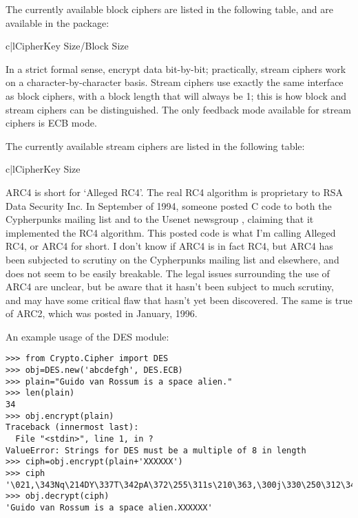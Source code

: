 \documentclass{howto}
\begin{document}
The currently available block ciphers are listed in the following table,
and are available in the  package:


\begin{tableii}{c|l}{}{Cipher}{Key Size/Block Size}
\end{tableii}

In a strict formal sense,  encrypt data bit-by-bit;
practically, stream ciphers work on a character-by-character basis.
Stream ciphers use exactly the
same interface as block ciphers, with a block length that will always
be 1; this is how block and stream ciphers can be distinguished. 
The only feedback mode available for stream ciphers is ECB mode. 

The currently available stream ciphers are listed in the following table:

\begin{tableii}{c|l}{}{Cipher}{Key Size}
\end{tableii}

ARC4 is short for `Alleged RC4'.  The real RC4 algorithm is proprietary
to RSA Data Security Inc.  In September of 1994, someone posted C code
to both the Cypherpunks mailing list and to the Usenet newsgroup
, claiming that it implemented the RC4 algorithm.  This
posted code is what I'm calling Alleged RC4, or ARC4 for short.  I don't
know if ARC4 is in fact RC4, but ARC4 has been subjected to scrutiny on
the Cypherpunks mailing list and elsewhere, and does not seem to be
easily breakable.  The legal issues surrounding the use of ARC4 are
unclear, but be aware that it hasn't been subject to much scrutiny, and
may have some critical flaw that hasn't yet been discovered.  The same
is true of ARC2, which was posted in January, 1996.

An example usage of the DES module:
\begin{verbatim}
>>> from Crypto.Cipher import DES
>>> obj=DES.new('abcdefgh', DES.ECB)
>>> plain="Guido van Rossum is a space alien."
>>> len(plain)
34
>>> obj.encrypt(plain)
Traceback (innermost last):
  File "<stdin>", line 1, in ?
ValueError: Strings for DES must be a multiple of 8 in length
>>> ciph=obj.encrypt(plain+'XXXXXX')
>>> ciph
'\021,\343Nq\214DY\337T\342pA\372\255\311s\210\363,\300j\330\250\312\347\342I\3215w\03561\303dgb/\006'
>>> obj.decrypt(ciph)
'Guido van Rossum is a space alien.XXXXXX'
\end{verbatim}
\end{document}
